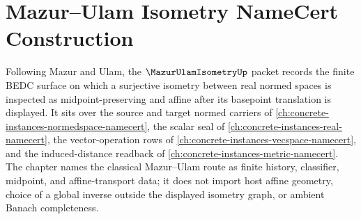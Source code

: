 \chapter{Mazur--Ulam Isometry NameCert Construction}
\label{ch:concrete-instances-mazur-ulam-isometry-namecert}

Following Mazur and Ulam, the $\MazurUlamIsometryUp$ packet records the finite BEDC surface on which a surjective isometry between real normed spaces is inspected as midpoint-preserving and affine after its basepoint translation is displayed. It sits over the source and target normed carriers of \autoref{ch:concrete-instances-normedspace-namecert}, the scalar seal of \autoref{ch:concrete-instances-real-namecert}, the vector-operation rows of \autoref{ch:concrete-instances-vecspace-namecert}, and the induced-distance readback of \autoref{ch:concrete-instances-metric-namecert}. The chapter names the classical Mazur--Ulam route as finite history, classifier, midpoint, and affine-transport data; it does not import host affine geometry, choice of a global inverse outside the displayed isometry graph, or ambient Banach completeness.

